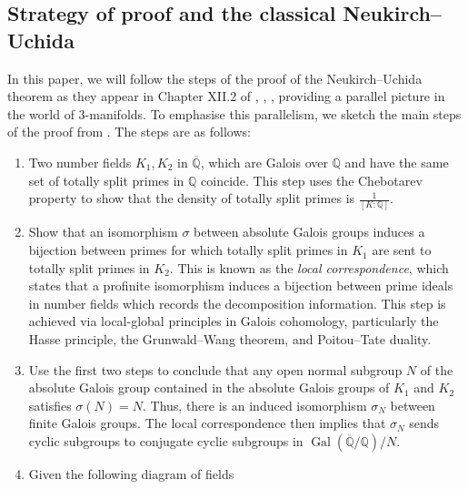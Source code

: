\documentclass{amsart}
\theoremstyle{plain}
\theoremstyle{definition}
\theoremstyle{plain}
\theoremstyle{plain}
\theoremstyle{plain}
\theoremstyle{remark}
\theoremstyle{remark}
\theoremstyle{plain}
\theoremstyle{definition}
\theoremstyle{plain}
\DeclareMathOperator{\Gal}{\mathrm{Gal}}
\newcounter{main}
\theoremstyle{plain}
\theoremstyle{plain}
\numberwithin{equation}{section}
\begin{document}
\subsection{Strategy of proof and the classical Neukirch--Uchida}\label{subsec:NU}

In this paper, we will follow the steps of the proof of the Neukirch--Uchida theorem as they appear in Chapter XII.2 of \cite{neukirch2013cohomology}, \cite{neukirchinvenciones}, \cite{uchida}, providing a parallel picture in the world of $3$-manifolds. To emphasise this parallelism, we sketch the main steps of the proof from \cite{neukirch2013cohomology}. The steps are as follows:
\begin{enumerate}
    \item Two number fields $K_1,K_2$ in $\overline{\mathbb{Q}}$, which are Galois over $\mathbb{Q}$ and have the same set of totally split primes in $\mathbb{Q}$ coincide. This step uses the Chebotarev property to show that the density of totally split primes is $\frac{1}{[K:\mathbb{Q}]}$.
    \item Show that an isomorphism $\sigma$ between absolute Galois groups induces a bijection between primes for which totally split primes in $K_1$ are sent to totally split primes in $K_2$. This is known as the \emph{local correspondence}, which states that a profinite isomorphism induces a bijection between prime ideals in number fields which records the decomposition information. This step is achieved via local-global principles in Galois cohomology, particularly the Hasse principle, the Grunwald--Wang theorem, and Poitou--Tate duality.
    \item Use the first two steps to conclude that any open normal subgroup $N$ of the absolute Galois group contained in the absolute Galois groups of $K_1$ and $K_2$ satisfies $\sigma(N) = N$. Thus, there is an induced isomorphism $\sigma_N$ between finite Galois groups. The local correspondence then implies that $\sigma_N$ sends cyclic subgroups to conjugate cyclic subgroups in $\Gal(\overline{\mathbb{Q}}/\mathbb{Q})/N$.
    \item Given the following diagram of fields
    \begin{center}
\end{center}
\end{enumerate}
\end{document}
